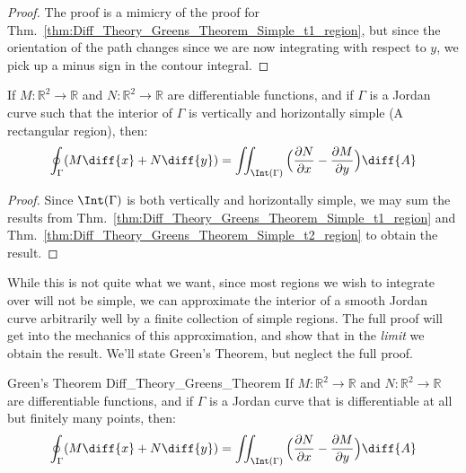 \documentclass[crop=false,class=book,oneside]{standalone}
\begin{document}
            \begin{proof}
                The proof is a mimicry of the proof for
                Thm.~\ref{thm:Diff_Theory_Greens_Theorem_Simple_t1_region},
                but since the orientation of the path changes since we are
                now integrating with respect to $y$, we pick up a minus sign
                in the contour integral.
            \end{proof}
            \begin{theorem}
                If $M:\mathbb{R}^{2}\rightarrow\mathbb{R}$ and
                $N:\mathbb{R}^{2}\rightarrow\mathbb{R}$ are
                differentiable functions, and if
                $\Gamma$ is a Jordan curve such that the
                interior of $\Gamma$ is vertically and horizontally
                simple (A rectangular region), then:
                \begin{equation}
                    \oint_{\Gamma}(M\diff{x}+N\diff{y})=
                    \iint_{\Int(\Gamma)}\Big(
                    \frac{\partial{N}}{\partial{x}}-
                    \frac{\partial{M}}{\partial{y}}\Big)\diff{A}
                \end{equation}
            \end{theorem}
            \begin{proof}
                Since $\Int(\Gamma)$ is both vertically and horizontally
                simple, we may sum the results from
                Thm.~\ref{thm:Diff_Theory_Greens_Theorem_Simple_t1_region}
                and Thm.~\ref{thm:Diff_Theory_Greens_Theorem_Simple_t2_region}
                to obtain the result.
            \end{proof}
            While this is not quite what we want, since most regions we wish
            to integrate over will not be simple, we can approximate the interior
            of a smooth Jordan curve arbitrarily well by a finite collection of
            simple regions. The full proof will get into the mechanics of this
            approximation, and show that in the \textit{limit} we obtain the
            result. We'll state Green's Theorem, but neglect the full proof.
            \begin{ftheorem}{Green's Theorem}
                            {Diff_Theory_Greens_Theorem}
                If $M:\mathbb{R}^{2}\rightarrow\mathbb{R}$ and
                $N:\mathbb{R}^{2}\rightarrow\mathbb{R}$ are
                differentiable functions, and if
                $\Gamma$ is a Jordan curve that is differentiable at
                all but finitely many points, then:
                \begin{equation}
                    \oint_{\Gamma}(M\diff{x}+N\diff{y})=
                    \iint_{\Int(\Gamma)}\Big(
                    \frac{\partial{N}}{\partial{x}}-
                    \frac{\partial{M}}{\partial{y}}\Big)\diff{A}
                \end{equation}
            \end{ftheorem}
\end{document}
